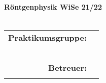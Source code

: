 \begin{titlepage}

\vspace{19mm}

\begin{center}
	{\LARGE
		\textbf{\versuch} \\ {\normalsize \textbf{\untertitel}} \\
	}
	\vspace{8mm}
	\textbf{Röntgenphysik WiSe 21/22}\\
	\datumversuch \\
    
	\vspace{10mm}
\end{center}

\begin{table}[H]
\centering 
\begin{tabular}{r l}
\hspace{2cm}\textbf{Praktikumsgruppe:}
	&	\studentnameeins	\\
	&	\studentnamezwei	\\
	&	\studentnamedrei	\\
	&	\studentnamevier	\\
	&	\studentnamefuenf	\\
	&  						\\

\textbf{Betreuer:}
	&	\betreuer				\\
	&						\\
\end{tabular}
\end{table}

\vspace{5mm}

\end{titlepage}